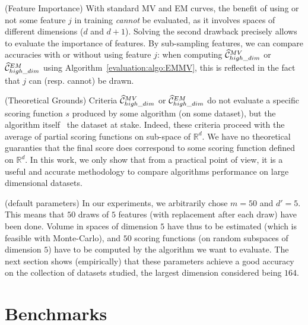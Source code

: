 \begin{remark}({\sc Feature Importance})
With standard MV and EM curves, the benefit of using or not some feature $j$ in training \emph{cannot} be evaluated, as it involves spaces of different dimensions ($d$ and $d+1$). %
%
Solving the second drawback precisely allows to evaluate the importance of features.
By sub-sampling features, we can compare accuracies with or without using feature $j$: when computing $\widehat{\mathcal{C}}^{MV}_{high\_dim}$ or $\widehat{\mathcal{C}}^{EM}_{high\_dim}$ using Algorithm~\ref{evaluation:algo:EMMV}, this is reflected in the fact that $j$ can (resp. cannot) be drawn.
\end{remark}

\begin{remark}({\sc Theoretical Grounds})
Criteria $\widehat{\mathcal{C}}^{MV}_{high\_dim}$ or $\widehat{\mathcal{C}}^{EM}_{high\_dim}$ do not evaluate a specific scoring function $s$ produced by some algorithm (on some dataset), but the algorithm itself \wrt~the dataset at stake. Indeed, these criteria proceed with the average of partial scoring functions on sub-space of $\mathbb{R}^d$. We have no theoretical guaranties that the final score does correspond to some scoring function defined on $\mathbb{R}^d$. In this work, we only show that from a practical point of view, it is a useful and accurate methodology to compare algorithms performance on large dimensional datasets.
\end{remark}

\begin{remark}({\sc default parameters}) 
In our experiments, we arbitrarily chose $m = 50$ and $d'=5$. This means that $50$ draws of $5$ features (with replacement after each draw) have been done. Volume in spaces of dimension $5$ have thus to be estimated (which is feasible with Monte-Carlo), and $50$ scoring functions (on random subspaces of dimension $5$) have to be computed by the algorithm we want to evaluate.
The next section shows (empirically) that these parameters achieve a good accuracy on the collection of datasets studied, the largest dimension considered being $164$.
\end{remark}

\section{Benchmarks}
\label{evaluation:sec:benchmarks}

